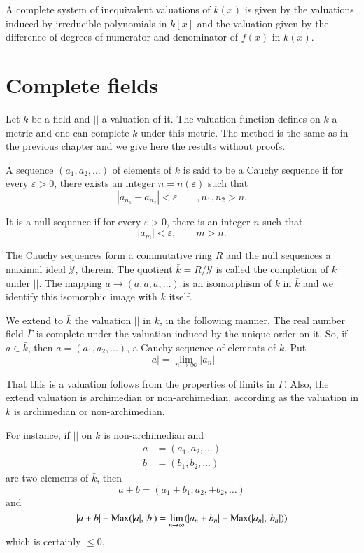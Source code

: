 \begin{thm}\label{chap8:thm3}%
 A complete system of inequivalent valuations of $k(x)$ is given
  by the valuations induced by irreducible polynomials in $k[x]$ and
  the valuation given by the difference of degrees of numerator and
  denominator of $f(x)$ in $k(x)$. 
\end{thm}


\section{Complete fields}%

Let $k$ be a field and $| |$ a valuation of it. The valuation function
defines on $k$ a metric and one can complete $k$ under this
metric. The method is the same as in the previous chapter and we give
here the results without proofs. 

A sequence $(a_1, a_2, \ldots)$ of elements of $k$ is said to be a
Cauchy sequence if for every $\varepsilon > 0$, there exists an
integer $n = n(\varepsilon)$ such that 
$$
|a_{n_1} - a_{n_2}| < \varepsilon \qquad , n_1 , n_2 > n . 
$$

It is a null sequence if for every $\varepsilon > 0$, there is an
integer $n$ such that
$$
|a_m| < \varepsilon , \qquad m > n .
$$\pageoriginale

The Cauchy sequences form a commutative ring $R$ and the null
sequences a maximal ideal $\mathscr{Y}$, therein. The quotient
$\bar{k} = R/\mathscr{Y}$ is called the completion of $k$ under $|
|$. The mapping $a \to (a, a, a, \ldots)$ is an isomorphism of $k$ in
$\bar{k}$ and we identify this isomorphic image with $k$ itself. 

We extend to $\bar{k}$ the valuation $| |$ in $k$, in the following
manner. The real number field $\bar{\Gamma}$ is complete under the
valuation induced by the unique order on it. So, if $a \in \bar{k}$,
then $a = (a_1, a_2, \ldots)$, a Cauchy sequence of elements of
$k$. Put  
$$
|a| = \lim_{n \to \infty} |a_n|
$$

That this is a valuation follows from the properties of limits in
$\bar{\Gamma}$. Also, the extend valuation is archimedian or
non-archimedian, according as the valuation in $k$ is archimedian or
non-archimedian.

For instance, if $| |$ on $k$ is non-archimedian and
\begin{align*}
a & = (a_1 , a_2 , \ldots)\\
b & = (b_1 , b_2 , \ldots)
\end{align*}
are two elements of $\bar{k}$, then
$$
a + b = (a_1 + b_1 , a_2 , + b_2 , \ldots)
$$
and
$$
|a + b| - \operatorname{Max} ( |a| , |b| ) = \lim_{n \to \infty} (|a_n + b_n| - \operatorname{Max}
(|a_n|, |b_n|)) 
$$
which is certainly $\le 0$,

